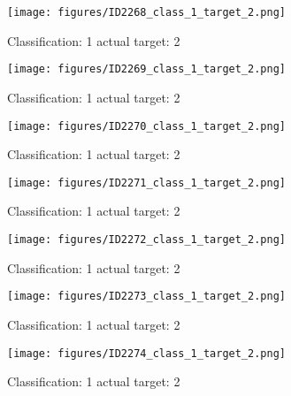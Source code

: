 \begin{figure}[h!]
\begin{center}
\texttt{[image: figures/ID2268\_class\_1\_target\_2.png]}
\end{center}
\caption{ Classification: 1 actual target: 2}
\label{fig:ID2268_class_1_target_2}
\end{figure}
\begin{figure}[h!]
\begin{center}
\texttt{[image: figures/ID2269\_class\_1\_target\_2.png]}
\end{center}
\caption{ Classification: 1 actual target: 2}
\label{fig:ID2269_class_1_target_2}
\end{figure}
\begin{figure}[h!]
\begin{center}
\texttt{[image: figures/ID2270\_class\_1\_target\_2.png]}
\end{center}
\caption{ Classification: 1 actual target: 2}
\label{fig:ID2270_class_1_target_2}
\end{figure}
\begin{figure}[h!]
\begin{center}
\texttt{[image: figures/ID2271\_class\_1\_target\_2.png]}
\end{center}
\caption{ Classification: 1 actual target: 2}
\label{fig:ID2271_class_1_target_2}
\end{figure}
\begin{figure}[h!]
\begin{center}
\texttt{[image: figures/ID2272\_class\_1\_target\_2.png]}
\end{center}
\caption{ Classification: 1 actual target: 2}
\label{fig:ID2272_class_1_target_2}
\end{figure}
\begin{figure}[h!]
\begin{center}
\texttt{[image: figures/ID2273\_class\_1\_target\_2.png]}
\end{center}
\caption{ Classification: 1 actual target: 2}
\label{fig:ID2273_class_1_target_2}
\end{figure}
\begin{figure}[h!]
\begin{center}
\texttt{[image: figures/ID2274\_class\_1\_target\_2.png]}
\end{center}
\caption{ Classification: 1 actual target: 2}
\label{fig:ID2274_class_1_target_2}
\end{figure}
